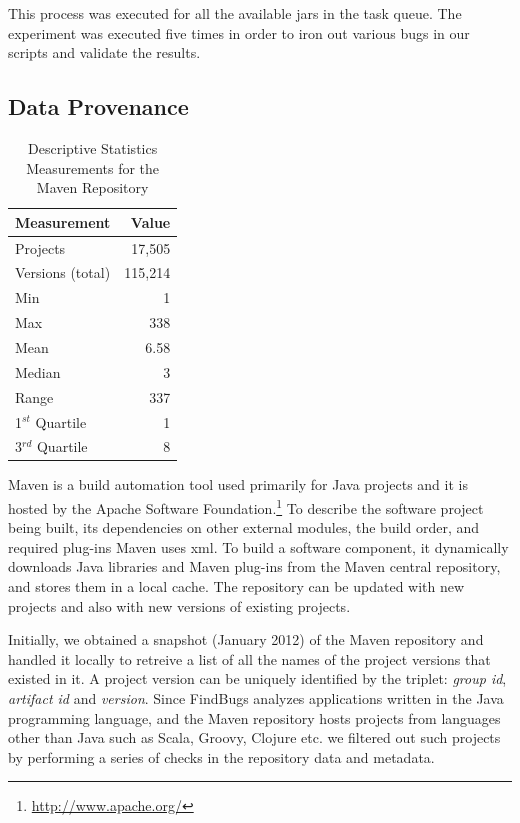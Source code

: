 \documentclass[conference]{llncs}
\begin{document}
This process was executed for all the available {\sc jar}s in the task queue.
The experiment was executed five times in order to iron out various bugs in
our scripts and validate the results. 

\subsection{Data Provenance}
\label{sec:data}

\begin{table}
\centering
\caption{Descriptive Statistics Measurements for the Maven Repository}
\label{tbl:repository}
\begin{tabular}{l r}
\hline
Measurement & Value\\
 \hline
Projects & 17,505\\
Versions (total) & 115,214\\
Min & 1\\
Max & 338\\
Mean & 6.58\\
Median & 3\\
Range & 337\\
1$^{st}$ Quartile & 1\\
3$^{rd}$ Quartile & 8\\
\hline
\end{tabular}
\end{table}

Maven is a build automation tool used primarily for Java projects and it is
hosted by the Apache Software Foundation.\footnote{\url{http://www.apache.org/}}
To describe the software project being built, its dependencies
on other external modules, the build order, and required plug-ins Maven uses
{\sc xml}. To build a software component, it dynamically downloads Java libraries
and Maven plug-ins from the Maven central repository,
and stores them in a local cache. The repository can be updated with
new projects and also with new versions of existing projects.

Initially, we obtained a snapshot (January 2012) of the Maven repository and
handled it locally to retreive a list of all the names of the project versions
that existed in it. A project version can be uniquely identified by the triplet:
{\it group id}, {\it artifact id} and {\it version}.
Since FindBugs analyzes applications written in the Java
programming language, and the Maven repository
hosts projects from languages other than Java such as Scala, Groovy,
Clojure etc. we filtered out such projects by performing a series of checks in
the repository data and metadata.
\end{document}
